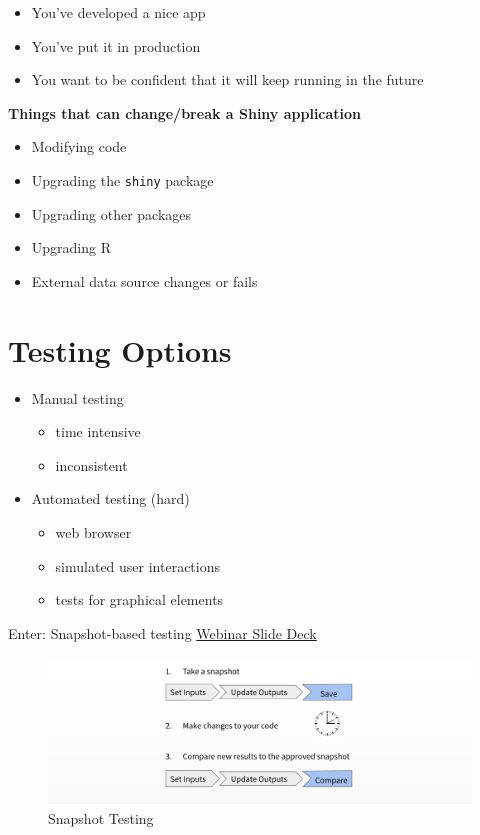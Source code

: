 \documentclass[]{book}
\providecommand{\tightlist}{%
  \setlength{\itemsep}{0pt}\setlength{\parskip}{0pt}}
\theoremstyle{definition}
\theoremstyle{definition}
\theoremstyle{definition}
\theoremstyle{remark}
\begin{document}
\begin{itemize}
\tightlist
\item
  You've developed a nice app
\item
  You've put it in production
\item
  You want to be confident that it will keep running in the future
\end{itemize}

\textbf{Things that can change/break a Shiny application}

\begin{itemize}
\tightlist
\item
  Modifying code
\item
  Upgrading the \texttt{shiny} package
\item
  Upgrading other packages
\item
  Upgrading R
\item
  External data source changes or fails
\end{itemize}

\hypertarget{testing-options}{%
\section{Testing Options}\label{testing-options}}

\begin{itemize}
\tightlist
\item
  Manual testing

  \begin{itemize}
  \tightlist
  \item
    time intensive
  \item
    inconsistent
  \end{itemize}
\item
  Automated testing (hard)

  \begin{itemize}
  \tightlist
  \item
    web browser
  \item
    simulated user interactions
  \item
    tests for graphical elements
  \end{itemize}
\end{itemize}

Enter: Snapshot-based testing
\href{https://github.com/rstudio/webinars/blob/master/48-shinytest/shinytest.pdf}{Webinar
Slide Deck}

\begin{figure}
\centering
\includegraphics{imgs/testing/snapshot-testing.png}
\caption{Snapshot Testing}
\end{figure}
\end{document}
